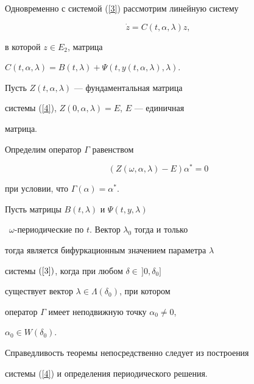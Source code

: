 Одновременно с системой (\ref{3}) рассмотрим линейную систему


\begin{equation}


\label{4}


\Dot z=C(t,\alpha, \lambda)z,


\end{equation}


в которой $z \in E_2$, матрица


$C(t,\alpha,\lambda)=B(t,\lambda)+\Psi (t,y(t,\alpha,\lambda),\lambda)$.


Пусть $Z(t,\alpha,\lambda)$ --- фундаментальная матрица


системы (\ref{4}), $Z(0,\alpha,\lambda)=E$, $E$ --- единичная


матрица.





Определим оператор $\Gamma$ равенством


\begin{equation}


\label{5}


(Z(\omega,\alpha,\lambda) - E)\alpha ^* =0


\end{equation}


при условии, что $\Gamma (\alpha)=\alpha ^*$.





\begin{thm}


Пусть матрицы $B(t,\lambda)$ и $\Psi (t,y,\lambda)$ 


\ $\omega$-периодические по $t$. Вектор $\lambda_0$ тогда и только


тогда является бифуркационным значением параметра $\lambda$


системы $(\ref{3})$, когда при любом $\delta \in\,]0,\delta_0]$


существует вектор $\lambda \in \Lambda (\delta_0)$, при котором


оператор $\Gamma$ имеет неподвижную точку $\alpha_0 \ne 0$,


$\alpha_0 \in W(\delta_0)$.


\end{thm}





Справедливость теоремы непосредственно следует из построения


системы (\ref{4}) и определения периодического решения.





